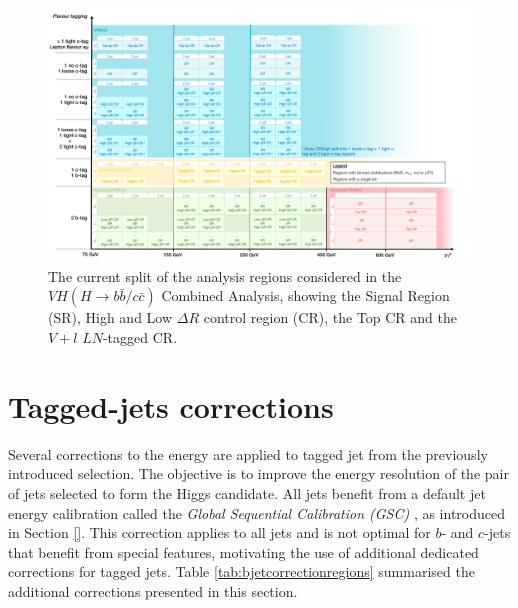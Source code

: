 \newpage

\begin{figure}
    \centering
    \includegraphics[width=\textwidth]{Images/VH/Cat/VH_analysis_cat.pdf}
    \caption{The current split of the analysis regions considered in the $VH (H\rightarrow b\bar{b}/c\bar{c})$ Combined Analysis, showing the Signal Region (SR), High and Low $\Delta R$ control region (CR), the Top CR and the $V+l$ $LN$-tagged CR.} 
    \label{fig:ana-strat-det}
\end{figure}

\clearpage

\section{Tagged-jets corrections}\label{sec-vh-jetcor}
Several corrections to the energy are applied to tagged jet from the previously introduced selection. The objective is to improve the energy resolution of the pair of jets selected to form the Higgs candidate. All jets benefit from a default jet energy calibration called the \textit{Global Sequential Calibration (GSC)} \cite{PhysRevD.96.072002}, as introduced in Section \ref{}. This correction applies to all jets and is not optimal for $b$- and $c$-jets that benefit from special features, motivating the use of additional dedicated corrections for tagged jets. Table \ref{tab:bjetcorrectionregions} summarised the additional corrections presented in this section. %

